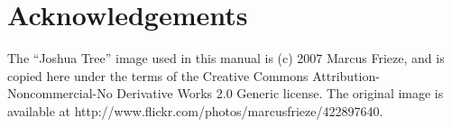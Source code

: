 \chapter{Acknowledgements}

The ``Joshua Tree'' image used in this manual is (c) 2007 Marcus Frieze, and is copied here under the terms of the Creative Commons Attribution-Noncommercial-No Derivative Works 2.0 Generic license. The original image is available at http://www.flickr.com/photos/marcusfrieze/422897640.

